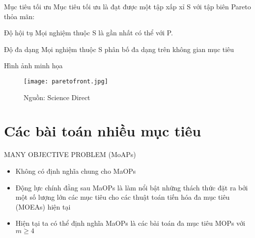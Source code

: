 \documentclass{beamer}
\begin{document}
\begin{frame}{Mục tiêu tối ưu}
    Mục tiêu tối ưu là đạt được một tập xấp xỉ S với tập biên Pareto thỏa mãn:
    \pause
    \begin{block}{Độ hội tụ}
        Mọi nghiệm thuộc S là gần nhất có thể với P.
        \end{block}
    \pause
    \begin{block}{Độ đa dạng}
    Mọi nghiệm thuộc S phân bố đa dạng trên không gian mục tiêu
    \end{block}
\end{frame}
\begin{frame}{Hình ảnh minh họa}
    \begin{figure}
    \texttt{[image: paretofront.jpg]}
    \caption{Nguồn: Science Direct}
    \end{figure}
\end{frame}




\section{Các bài toán nhiều mục tiêu}

\begin{frame}{MANY OBJECTIVE PROBLEM (MoAPs)}
    \begin{itemize}
        \item <1-> Không có định nghĩa chung cho MaOPs
        \item <2-> Động lực chính đằng sau MaOPs là làm nổi bật những thách thức đặt ra bởi một số lượng lớn các mục tiêu cho các thuật toán tiến hóa đa mục tiêu (MOEAs) hiện tại
        \item <3-> Hiện tại ta có thể định nghĩa MaOPs là các bài toán đa mục tiêu MOPs với $m \geq 4$
    \end{itemize}
\end{frame}
\end{document}

